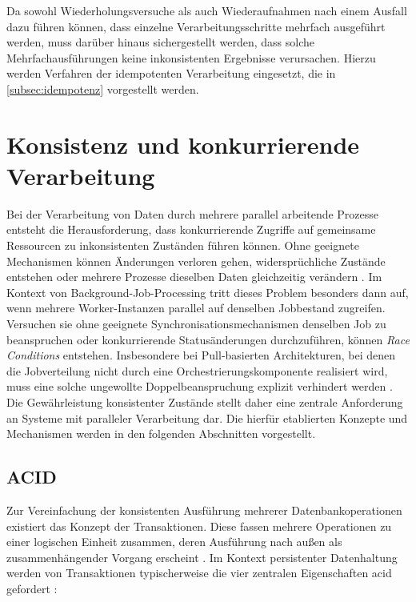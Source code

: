 Da sowohl Wiederholungsversuche als auch Wiederaufnahmen nach einem Ausfall dazu führen können, dass einzelne Verarbeitungsschritte
mehrfach ausgeführt werden, muss darüber hinaus sichergestellt werden, dass solche Mehrfachausführungen keine inkonsistenten
Ergebnisse verursachen.
Hierzu werden Verfahren der idempotenten Verarbeitung eingesetzt, die in \cref{subsec:idempotenz} vorgestellt werden.

\section{Konsistenz und konkurrierende Verarbeitung}
\label{sec:konsistenz}
Bei der Verarbeitung von Daten durch mehrere parallel arbeitende Prozesse entsteht die Herausforderung, dass konkurrierende
Zugriffe auf gemeinsame Ressourcen zu inkonsistenten Zuständen führen können.
Ohne geeignete Mechanismen können Änderungen verloren gehen, widersprüchliche Zustände entstehen oder mehrere Prozesse dieselben
Daten gleichzeitig verändern \parencite[Kap.~13.1.2]{saake_datenbanken_2018}.
Im Kontext von Background-Job-Processing tritt dieses Problem besonders dann auf, wenn mehrere Worker-Instanzen parallel auf
denselben Jobbestand zugreifen.
Versuchen sie ohne geeignete Synchronisationsmechanismen denselben Job zu beanspruchen oder konkurrierende Statusänderungen
durchzuführen, können \textit{Race Conditions} entstehen.
Insbesondere bei Pull-basierten Architekturen, bei denen die Jobverteilung nicht durch eine Orchestrierungskomponente realisiert
wird, muss eine solche ungewollte Doppelbeanspruchung explizit verhindert werden \parencite[Kap.~7 Abschnitt \glqq Isolation\grqq]{kleppmann_designing_2017}.
Die Gewährleistung konsistenter Zustände stellt daher eine zentrale Anforderung an Systeme mit paralleler Verarbeitung dar.
Die hierfür etablierten Konzepte und Mechanismen werden in den folgenden Abschnitten vorgestellt.

\subsection{ACID}
\label{subsec:acid}
Zur Vereinfachung der konsistenten Ausführung mehrerer Datenbankoperationen existiert das Konzept der Transaktionen.
Diese fassen mehrere Operationen zu einer logischen Einheit zusammen, deren Ausführung nach außen als zusammenhängender Vorgang
erscheint \parencite[Kap.~7]{kleppmann_designing_2017}.
Im Kontext persistenter Datenhaltung werden von Transaktionen typischerweise die vier zentralen Eigenschaften \gls{acid}
gefordert \parencite[Kap.~13.1.1]{saake_datenbanken_2018}:


